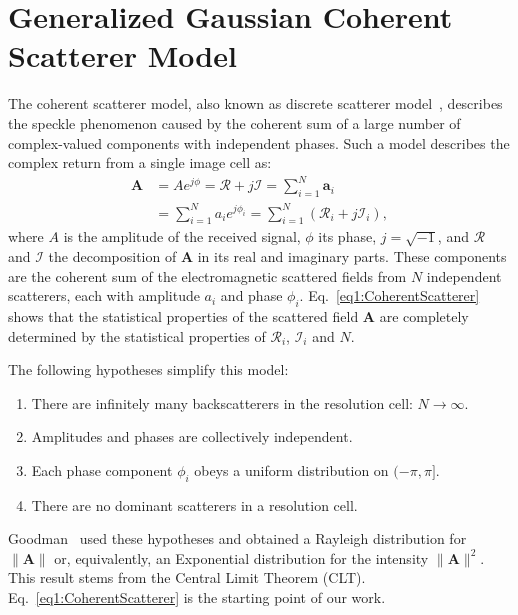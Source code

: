 \documentclass[journal]{IEEEtran}
\begin{document}
\section{Generalized Gaussian Coherent Scatterer Model}\label{Sec:GGCSModel}

The coherent scatterer model, also known as discrete scatterer model~\cite{Oliver:2004}, describes the speckle phenomenon caused by the coherent sum of a large number of complex-valued components with independent phases.
Such a model describes the complex return from a single image cell as:
\begin{align}
\boldsymbol{A} & =A e^{j \phi}=\mathcal{R}+j \mathcal{I}=\sum_{i=1}^{N} \boldsymbol{a}_{i} \nonumber \\
& =\sum_{i=1}^{N} a_{i} e^{j \phi_{i}}=\sum_{i=1}^{N}\left(\mathcal{R}_{i}+j \mathcal{I}_{i}\right),
\label{eq1:CoherentScatterer}
\end{align}
where
$A$ is the amplitude of the received signal,
$\phi$ its phase,
$j=\sqrt{-1}$, and
$\mathcal R$ and $\mathcal I$ the decomposition of $\boldsymbol{A}$ in its real and imaginary parts.
These components are the coherent sum of the electromagnetic scattered fields from $N$ independent scatterers, each with amplitude $a_i$ and phase $\phi_i$.
Eq.~\eqref{eq1:CoherentScatterer} shows that the statistical properties of the scattered field $\boldsymbol{A}$ are completely determined by the statistical properties of $\mathcal{R}_{i}$, $\mathcal{I}_{i}$ and $N$.

The following hypotheses simplify this model:
\begin{enumerate}[{H}-1)]
\item\label{NInfty} There are infinitely many backscatterers in the resolution cell: $N\to\infty$.
\item\label{Indep} Amplitudes and phases are collectively independent.
\item\label{Uniform} Each phase component $\phi_{i}$ obeys a uniform distribution on $(-\pi,\pi]$.
\item\label{NoDominant} There are no dominant scatterers in a resolution cell.
\end{enumerate}
Goodman~\cite{ChapterGoodman} used these hypotheses and obtained a Rayleigh distribution for $\|\boldsymbol{A}\|$ or, equivalently, an Exponential distribution for the intensity $\|\boldsymbol{A}\|^2$.
This result stems from the Central Limit Theorem (CLT).
Eq.~\eqref{eq1:CoherentScatterer} is the starting point of our work.
\end{document}
